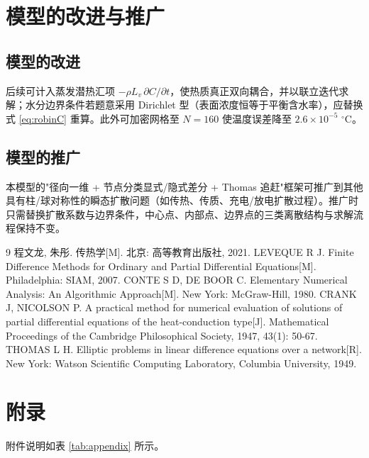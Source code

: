 \documentclass[12pt,a4paper]{ctexart}
\begin{document}
\section{模型的改进与推广}
\subsection{模型的改进}
后续可计入蒸发潜热汇项 $-\rho L_v\,\partial C/\partial t$，使热质真正双向耦合，并以联立迭代求解；水分边界条件若题意采用 Dirichlet 型（表面浓度恒等于平衡含水率），应替换式 \eqref{eq:robinC} 重算。此外可加密网格至 $N=160$ 使温度误差降至 $2.6\times10^{-5}$ $^\circ$C。
\subsection{模型的推广}
本模型的"径向一维 + 节点分类显式/隐式差分 + Thomas 追赶"框架可推广到其他具有柱/球对称性的瞬态扩散问题（如传热、传质、充电/放电扩散过程）。推广时只需替换扩散系数与边界条件，中心点、内部点、边界点的三类离散结构与求解流程保持不变。

\begin{thebibliography}{9}
 程文龙, 朱彤. 传热学[M]. 北京: 高等教育出版社, 2021.
 LEVEQUE R J. Finite Difference Methods for Ordinary and Partial Differential Equations[M]. Philadelphia: SIAM, 2007.
 CONTE S D, DE BOOR C. Elementary Numerical Analysis: An Algorithmic Approach[M]. New York: McGraw-Hill, 1980.
 CRANK J, NICOLSON P. A practical method for numerical evaluation of solutions of partial differential equations of the heat-conduction type[J]. Mathematical Proceedings of the Cambridge Philosophical Society, 1947, 43(1): 50-67.
 THOMAS L H. Elliptic problems in linear difference equations over a network[R]. New York: Watson Scientific Computing Laboratory, Columbia University, 1949.
\end{thebibliography}

\appendix
\section{附录}
附件说明如表 \ref{tab:appendix} 所示。
\end{document}
